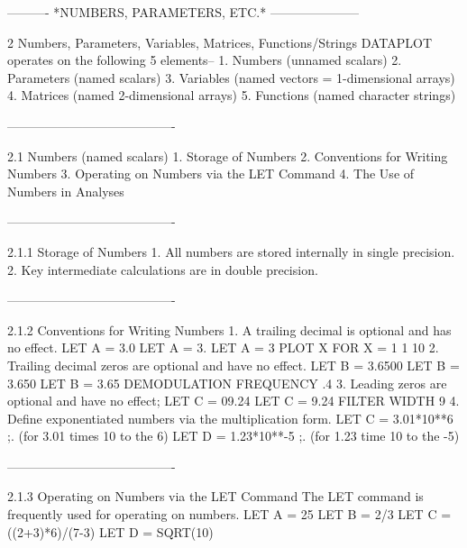  
 
 
 
 
 
 
 
 
 
 
 
 
 
 
 
 
 
 
 
 
 
 
 
 
 
----------  *NUMBERS, PARAMETERS, ETC.*  ---------------------
 
2
Numbers, Parameters, Variables, Matrices, Functions/Strings
   DATAPLOT operates on the following 5 elements--
      1. Numbers (unnamed scalars)
      2. Parameters (named scalars)
      3. Variables (named vectors = 1-dimensional arrays)
      4. Matrices (named 2-dimensional arrays)
      5. Functions (named character strings)
 
----------------------------------------
 
2.1
Numbers (named scalars)
   1. Storage of Numbers
   2. Conventions for Writing Numbers
   3. Operating on Numbers via the LET Command
   4. The Use of Numbers in Analyses
 
----------------------------------------
 
2.1.1
Storage of Numbers
   1. All numbers are stored internally in single precision.
   2. Key intermediate calculations are in double precision.
 
----------------------------------------
 
2.1.2
Conventions for Writing Numbers
   1. A trailing decimal is optional and has no effect.
         LET A = 3.0
         LET A = 3.
         LET A = 3
         PLOT X FOR X = 1 1 10
   2. Trailing decimal zeros are optional and have no effect.
         LET B = 3.6500
         LET B = 3.650
         LET B = 3.65
         DEMODULATION FREQUENCY .4
   3. Leading zeros are optional and have no effect;
         LET C = 09.24
         LET C = 9.24
         FILTER WIDTH 9
   4. Define exponentiated numbers via the multiplication form.
         LET C = 3.01*10**6 ;. (for 3.01 times 10 to the 6)
         LET D = 1.23*10**-5 ;. (for 1.23 time 10 to the -5)
 
----------------------------------------
 
2.1.3
Operating on Numbers via the LET Command
   The LET command is frequently used for operating on numbers.
      LET A = 25
      LET B = 2/3
      LET C = ((2+3)*6)/(7-3)
      LET D = SQRT(10)
 
